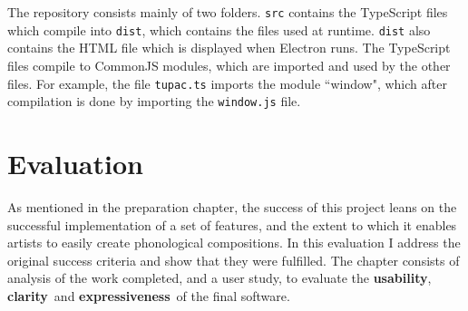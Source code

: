\documentclass[12pt,a4paper,oneside,openright]{report}
\newcommand{\usability}{\textbf{usability}}
\newcommand{\clarity}{\textbf{clarity}}
\newcommand{\expressiveness}{\textbf{expressiveness}}
\begin{document}
\DTsetlength{0.2em}{1em}{0.2em}{0.4pt}{2pt}
\setlength{\DTbaselineskip}{20pt}

The repository consists mainly of two folders. \verb|src| contains the TypeScript files which compile into \verb|dist|, which contains the files used at runtime. \verb|dist| also contains the HTML file which is displayed when Electron runs. The TypeScript files compile to CommonJS modules, which are imported and used by the other files. For example, the file \verb|tupac.ts| imports the module ``window", which after compilation is done by importing the \verb|window.js| file.

\chapter{Evaluation}\label{chap:eval}
As mentioned in the preparation chapter, the success of this project leans on the successful implementation of a set of features, and the extent to which it enables artists to easily create phonological compositions. In this evaluation I address the original success criteria and show that they were fulfilled. The chapter consists of analysis of the work completed, and a user study, to evaluate the \usability, \clarity\ and \expressiveness\ of the final software.
\end{document}
